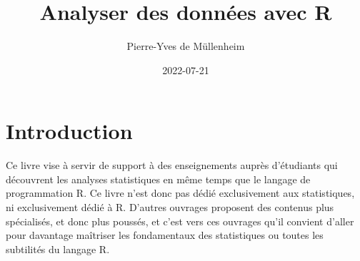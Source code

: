 \documentclass[
  french,
]{book}
\title{Analyser des données avec R}
\author{Pierre-Yves de Müllenheim}
\date{2022-07-21}
\begin{document}
\maketitle

\renewcommand*\contentsname{Sommaire}
{
\setcounter{tocdepth}{1}
\tableofcontents
}
\renewcommand{\listfigurename}{Liste des figures}
\renewcommand{\figurename}{Figure}
\renewcommand{\tablename}{Tableau}

\listoftables

\listoffigures

\hypertarget{introduction}{%
\chapter*{Introduction}\label{introduction}}

Ce livre vise à servir de support à des enseignements auprès d'étudiants qui découvrent les analyses statistiques en même temps que le langage de programmation R. Ce livre n'est donc pas dédié exclusivement aux statistiques, ni exclusivement dédié à R. D'autres ouvrages proposent des contenus plus spécialisés, et donc plus poussés, et c'est vers ces ouvrages qu'il convient d'aller pour davantage maîtriser les fondamentaux des statistiques ou toutes les subtilités du langage R.
\end{document}

